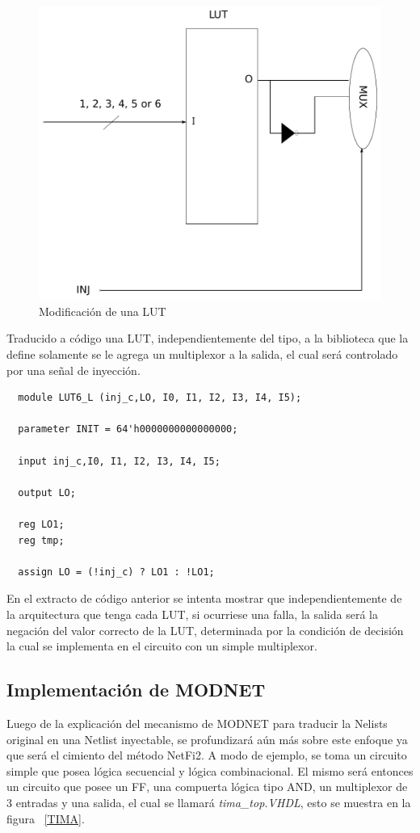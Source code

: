 \documentclass[a4paper,openright,12pt]{report}
\begin{document}
\begin{figure}[H]
	\centering
	\includegraphics[width=0.4 \textwidth]{img/LUT.pdf}
	\caption{Modificación de una LUT}
	\label{LUT}
\end{figure}


Traducido a código una LUT, independientemente del tipo, a la biblioteca que la define solamente se le agrega  un multiplexor a la salida, el cual será controlado por una señal de inyección. 
\begin{lstlisting}
  module LUT6_L (inj_c,LO, I0, I1, I2, I3, I4, I5);

  parameter INIT = 64'h0000000000000000;

  input inj_c,I0, I1, I2, I3, I4, I5;

  output LO;

  reg LO1;
  reg tmp;
  
  assign LO = (!inj_c) ? LO1 : !LO1;
\end{lstlisting}

En el extracto de código anterior se intenta mostrar que independientemente de la arquitectura que tenga cada LUT, si ocurriese una falla, la salida será la negación del valor correcto de la LUT, determinada por la condición de decisión la cual se implementa en el circuito con un simple  multiplexor.


\subsection{  Implementación de MODNET}

Luego de la explicación del mecanismo de MODNET para traducir la Nelists original  en una Netlist inyectable, se   profundizará aún más sobre este enfoque ya que será el cimiento del método NetFi2. 
A modo de ejemplo, se toma un circuito simple que posea lógica secuencial y lógica combinacional. El mismo será  entonces un circuito que posee un FF, una compuerta lógica tipo AND, un multiplexor de 3 entradas y una salida, el cual se llamará \textit{tima\_top.VHDL}, esto se muestra en la figura ~\ref{TIMA}.
\end{document}

